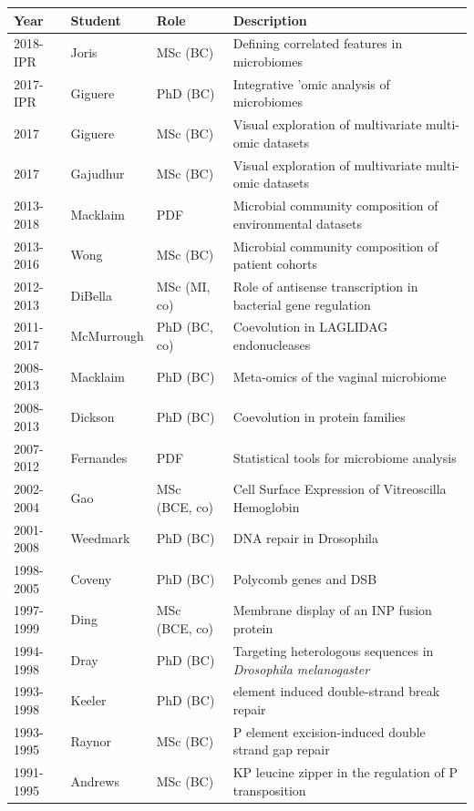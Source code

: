 \documentclass[11pt]{article}
\begin{document}
\vspace{0.5cm}
\begin{tabular}{llll}
Year & Student & Role &  Description \\ \hline
2018-IPR & Joris & MSc (BC) & Defining correlated features in microbiomes\\
2017-IPR & Giguere & PhD (BC) & Integrative 'omic analysis  of microbiomes\\
2017 & Giguere & MSc (BC) & Visual exploration of multivariate multi-omic datasets\\
2017 & Gajudhur & MSc (BC) & Visual exploration of multivariate multi-omic datasets\\
2013-2018 & Macklaim & PDF & Microbial community composition of environmental datasets\\
2013-2016 & Wong & MSc (BC) & Microbial community composition of patient cohorts\\
2012-2013 & DiBella & MSc (MI, co) & Role of antisense transcription in bacterial gene regulation\\
2011-2017 & McMurrough & PhD (BC, co) & Coevolution in LAGLIDAG endonucleases\\
2008-2013 & Macklaim & PhD (BC) & Meta-omics of the vaginal microbiome\\
2008-2013 & Dickson & PhD (BC) & Coevolution in protein families\\
2007-2012 & Fernandes & PDF & Statistical tools for microbiome analysis\\
2002-2004 & Gao & MSc (BCE, co) & Cell Surface Expression of Vitreoscilla Hemoglobin \\
2001-2008 & Weedmark & PhD (BC) & DNA repair in Drosophila\\
1998-2005 & Coveny & PhD (BC) & Polycomb genes and DSB\\
1997-1999 & Ding & MSc (BCE, co) & Membrane display of an INP fusion protein\\
1994-1998 & Dray & PhD (BC) & Targeting heterologous sequences in \emph{Drosophila melanogaster}\\
1993-1998 & Keeler & PhD (BC) &  element induced double-strand break repair\\
1993-1995 & Raynor & MSc (BC) & P element excision-induced double strand gap repair \\
1991-1995 & Andrews & MSc (BC)&  KP leucine zipper in the regulation of P transposition\\
\end{tabular} 

\clearpage
\end{document}
